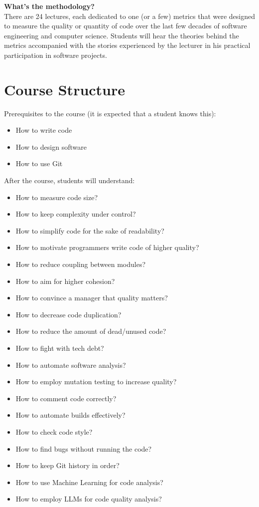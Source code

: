 \documentclass[nobrand,anonymous,nodate,nosecurity]{huawei}
\begin{document}
{\textbf{What's the methodology?}\\
There are 24 lectures, each dedicated to one (or a few) metrics that
were designed to measure the quality or quantity of code over the last
few decades of software engineering and computer science. Students will
hear the theories behind the metrics accompanied with the stories
experienced by the lecturer in his practical participation in software
projects.

\newpage
\section*{Course Structure}

Prerequisites to the course (it is expected that a student knows this):

\begin{itemize}
\item How to write code
\item How to design software
\item How to use Git
\end{itemize}

After the course, students  will understand:

\begin{itemize}
\item How to measure code size?
\item How to keep complexity under control?
\item How to simplify code for the sake of readability?
\item How to motivate programmers write code of higher quality?
\item How to reduce coupling between modules?
\item How to aim for higher cohesion?
\item How to convince a manager that quality matters?
\item How to decrease code duplication?
\item How to reduce the amount of dead/unused code?
\item How to fight with tech debt?
\item How to automate software analysis?
\item How to employ mutation testing to increase quality?
\item How to comment code correctly?
\item How to automate builds effectively?
\item How to check code style?
\item How to find bugs without running the code?
\item How to keep Git history in order?
\item How to use Machine Learning for code analysis?
\item How to employ LLMs for code quality analysis?
\end{itemize}

}
\end{document}
